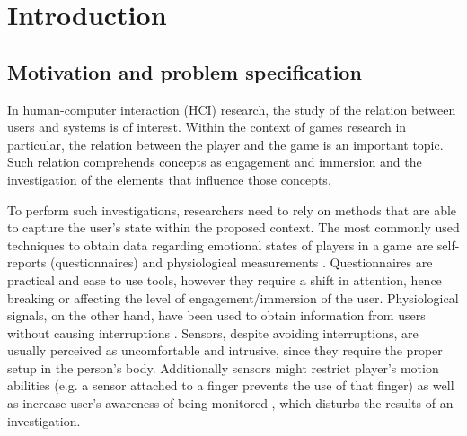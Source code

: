 \chapter{Introduction}
\label{c:introduction}

\section{Motivation and problem specification}

In human-computer interaction (HCI) research, the study of the relation between users and systems is of interest. Within the context of games research in particular, the relation between the player and the game is an important topic. Such relation comprehends concepts as engagement and immersion \parencite{boyle2012engagement} and the investigation of the elements that influence those concepts.

To perform such investigations, researchers need to rely on methods that are able to capture the user's state within the proposed context. The most commonly used techniques to obtain data regarding emotional states of players in a game are self-reports (questionnaires) and physiological measurements \parencite{mekler2014systematic}. Questionnaires are practical and ease to use tools, however they require a shift in attention, hence breaking or affecting the level of engagement/immersion of the user. Physiological signals, on the other hand, have been used to obtain information from users without causing interruptions \parencite{bousefsaf2013remote,yun2009game,rani2006empirical,tijs2008dynamic}. Sensors, despite avoiding interruptions, are usually perceived as uncomfortable and intrusive, since they require the proper setup in the person's body. Additionally sensors might restrict player's motion abilities (e.g. a sensor attached to a finger prevents the use of that finger) as well as increase user's awareness of being monitored \parencite{yamakoshi2007preliminary,yamaguchi2006evaluation,healey2005detecting}, which disturbs the results of an investigation.


